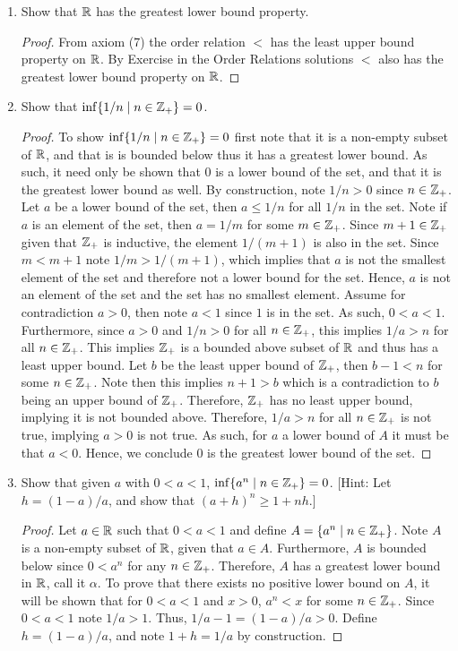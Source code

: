 \documentclass[12pt]{article}
\begin{document}
	\begin{enumerate}[label=(\alph*)]
		\item Show that $\mathbb{R}$ has the greatest lower bound property.
		\begin{proof}
			From axiom (7) the order relation $<$ has the least upper bound property on $\mathbb{R}$. By 
			Exercise  in the Order Relations solutions $<$ also has the greatest lower
			bound property on $\mathbb{R}$.
		\end{proof}
		\item Show that $\inf\{1/n \mid n \in \mathbb{Z}_{+}\} = 0$.
		\begin{proof}
			To show $\inf\{1/n \mid n \in \mathbb{Z}_{+}\} = 0$ first note that it is a non-empty subset of 
			$\mathbb{R}$, and that is is bounded below thus it has a greatest lower bound. As such, it need only 
			be shown that $0$ is a lower bound of the set, and that it is the greatest lower bound as well. 
			By construction, note $1/n > 0$ since $n \in \mathbb{Z}_{+}$. Let $a$ be a lower bound of the set,
			then $a \leq 1/n$ for all $1/n$ in the set. Note if $a$ is an element of the set, then
			$a = 1/m$ for some $m \in \mathbb{Z}_{+}$. Since $m + 1 \in \mathbb{Z}_{+}$ given that $\mathbb{Z}_{+}$ is 
			inductive, the element $1/(m + 1)$ is also in the set. Since $m < m + 1$ note 
			$1/m > 1/(m + 1)$, which implies that $a$ is not the smallest element of the set
			and therefore not a lower bound for the set. Hence, $a$ is not an element of the 
			set and the set has no smallest element. Assume for contradiction $a > 0$, then 
			note $a < 1$ since $1$ is in the set. As such, $0 < a < 1$. Furthermore,
			since $a > 0$ and $1/n > 0$ for all $n \in \mathbb{Z}_{+}$, this implies $1/a > n$ for 
			all $n \in \mathbb{Z}_{+}$. This implies $\mathbb{Z}_{+}$ is a bounded above subset of $\mathbb{R}$ and thus
			has a least upper bound. Let $b$ be the least upper bound of $\mathbb{Z}_{+}$, then
			$b - 1 < n$ for some $n \in \mathbb{Z}_{+}$. Note then this implies $n + 1 > b$ which is a contradiction
			to $b$ being an upper bound of $\mathbb{Z}_{+}$. Therefore, $\mathbb{Z}_{+}$ has no least upper bound, implying
			it is not bounded above. Therefore, $1/a > n$ for all $n \in \mathbb{Z}_{+}$ is not true, implying
			$a > 0$ is not true. As such, for $a$ a lower bound of $A$ it must be that $a < 0$.
			Hence, we conclude $0$ is the greatest lower bound of the set. 
		\end{proof}
		\item Show that given $a$ with $0 < a < 1$, $\inf\{a^n \mid n \in \mathbb{Z}_{+}\} = 0$. [Hint: 
		Let $h = (1 - a)/a$, and show that $(a + h)^n \geq 1 + nh$.]
		\begin{proof}
			Let $a \in \mathbb{R}$ such that $0 < a < 1$ and define $A = \{a^n \mid n \in \mathbb{Z}_{+}\}$.
			Note $A$ is a non-empty subset of $\mathbb{R}$, given that $a \in A$. Furthermore, $A$
			is bounded below since $0 < a^n$ for any $n \in \mathbb{Z}_{+}$. Therefore, $A$ has a 
			greatest lower bound in $\mathbb{R}$, call it $\alpha$. To prove that there exists no
			positive lower bound on $A$, it will be shown that for $0 < a < 1$ and $x > 0$,
			$a^{n} < x$ for some $n \in \mathbb{Z}_{+}$. Since $0 < a < 1$ note $1/a > 1$. Thus,
			$1/a - 1 = (1 - a)/a > 0$. Define $h = (1 - a)/a$, and note $1 + h = 1/a$ by construction.
			

\end{proof}
\end{enumerate}
\end{document}
